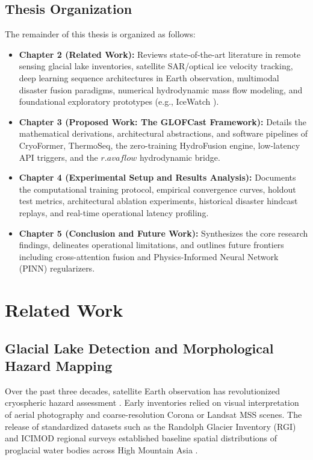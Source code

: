 \documentclass{mnnit}
\begin{document}
\section{Thesis Organization}
The remainder of this thesis is organized as follows:
\begin{itemize}
    \item \textbf{Chapter 2 (Related Work):} Reviews state-of-the-art literature in remote sensing glacial lake inventories, satellite SAR/optical ice velocity tracking, deep learning sequence architectures in Earth observation, multimodal disaster fusion paradigms, numerical hydrodynamic mass flow modeling, and foundational exploratory prototypes (e.g., IceWatch \cite{fatima2025icewatch}).
    \item \textbf{Chapter 3 (Proposed Work: The GLOFCast Framework):} Details the mathematical derivations, architectural abstractions, and software pipelines of CryoFormer, ThermoSeq, the zero-training HydroFusion engine, low-latency API triggers, and the $r.avaflow$ hydrodynamic bridge.
    \item \textbf{Chapter 4 (Experimental Setup and Results Analysis):} Documents the computational training protocol, empirical convergence curves, holdout test metrics, architectural ablation experiments, historical disaster hindcast replays, and real-time operational latency profiling.
    \item \textbf{Chapter 5 (Conclusion and Future Work):} Synthesizes the core research findings, delineates operational limitations, and outlines future frontiers including cross-attention fusion and Physics-Informed Neural Network (PINN) regularizers.
\end{itemize}


\chapter{Related Work}

\section{Glacial Lake Detection and Morphological Hazard Mapping}
Over the past three decades, satellite Earth observation has revolutionized cryospheric hazard assessment \cite{richardson2000overview, carrivick2016glof}. Early inventories relied on visual interpretation of aerial photography and coarse-resolution Corona or Landsat MSS scenes. The release of standardized datasets such as the Randolph Glacier Inventory (RGI) and ICIMOD regional surveys established baseline spatial distributions of proglacial water bodies across High Mountain Asia \cite{nie2017glacial}.
\end{document}
